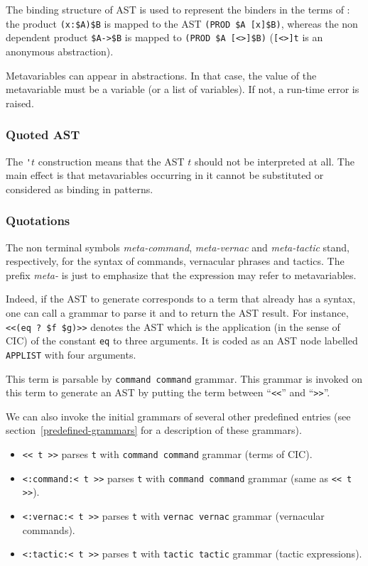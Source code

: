 The binding structure of AST is used to represent the binders in the
terms of {\Coq}: the product \verb+(x:$A)$B+ is mapped to the AST
\verb+(PROD $A [x]$B)+, whereas the non dependent product
\verb+$A->$B+ is mapped to \verb+(PROD $A [<>]$B)+ (\verb+[<>]t+ is an
anonymous abstraction).

Metavariables can appear in abstractions. In that case, the value of
the metavariable must be a variable (or a list of variables). If not,
a run-time error is raised.

\subsubsection{Quoted AST}

The \verb+'+$t$ construction means that the AST $t$ should not be
interpreted at all. The main effect is that metavariables occurring in
it cannot be substituted or considered as binding in patterns.

\subsubsection{Quotations}

The non terminal symbols {\sl meta-command}, {\sl meta-vernac} and
{\sl meta-tactic} stand, respectively, for the syntax of commands,
vernacular phrases and tactics. The prefix {\sl meta-} is just to
emphasize that the expression may refer to metavariables.

Indeed, if the AST to generate corresponds to a term that already has
a syntax, one can call a grammar to parse it and to return the AST
result. For instance, \verb+<<(eq ? $f $g)>>+ denotes the AST which is
the application (in the sense of CIC) of the constant {\tt eq} to
three arguments. It is coded as an AST node labelled {\tt APPLIST}
with four arguments.

This term is parsable by \verb+command command+ grammar. This grammar
is invoked on this term to generate an AST by putting the term between
``\verb+<<+'' and ``\verb+>>+''.

We can also invoke the initial grammars of several other predefined
entries (see section~\ref{predefined-grammars} for a description of
these grammars).

\begin{itemize}
\item \verb|<< t >>| parses {\tt t} with {\tt command command} grammar
(terms of CIC).
\item \verb|<:command:< t >>| parses {\tt t} with {\tt command command}
  grammar (same as \verb|<< t >>|).
\item \verb|<:vernac:< t >>| parses {\tt t} with {\tt vernac vernac}
  grammar (vernacular commands).
\item \verb|<:tactic:< t >>| parses {\tt t} with {\tt tactic tactic}
  grammar (tactic expressions).
\end{itemize}

